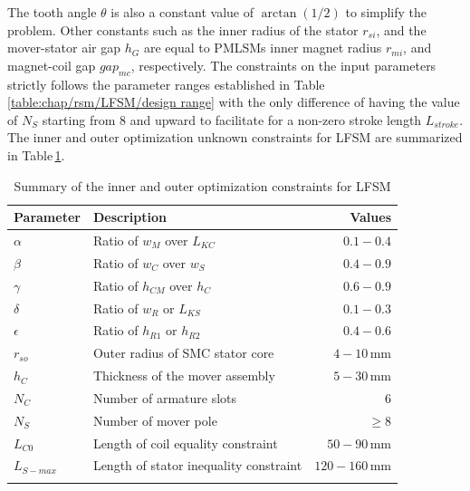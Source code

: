                 
                The tooth angle $\theta$ is also a constant value of $\arctan(1/2)$ to simplify the problem. Other constants such as the inner radius of the stator $r_{si}$, and the mover-stator air gap $h_G$ are equal to \acsp{PMLSM} inner magnet radius $r_{mi}$, and magnet-coil gap $gap_{mc}$, respectively. The constraints on the input parameters strictly follows the parameter ranges established in Table\,\ref{table:chap/rsm/LFSM/design range} with the only difference of having the value of $N_S$ starting from $8$ and upward to facilitate for a non-zero stroke length $L_{stroke}$. The inner and outer optimization unknown constraints for \acs{LFSM} are summarized in Table\,\ref{table:chap/rsm/LFSM/optimization unknown constraints}.
                
                
                \begin{table}[!ht]
                    \renewcommand{\arraystretch}{1.2}
                    \caption{Summary of the inner and outer optimization constraints for \acs{LFSM}}
                    \label{table:chap/rsm/LFSM/optimization unknown constraints}
                    \centering
                    \begin{tabular}{@{}llr@{}}
                    \hline
                    \bfseries Parameter & \bfseries Description & \bfseries Values\\
                    \hline
                        $\alpha$	    & Ratio of $w_M$ over $L_{KC}$              &	$0.1-0.4$\\ 
                        $\beta$	        & Ratio of $w_C$ over $w_S$		            &	$0.4-0.9$\\ 
                        $\gamma$	    & Ratio of $h_{CM}$ over $h_C$			    &	$0.6-0.9$\\ 
                        $\delta$	    & Ratio of $w_R$ or $L_{KS}$		        &	$0.1-0.3$\\ 
                        $\epsilon$	    & Ratio of $h_{R1}$ or $h_{R2}$		        &	$0.4-0.6$\\ 
                        $r_{so}$	    & Outer radius of SMC stator core 			&	$4-10\,\mathrm{mm}$\\ 
                        $h_C$           & Thickness of the mover assembly           &	$5-30\,\mathrm{mm}$\\ 
                    \hline
                        $N_C$	        & Number of armature slots 		            &	$6$\\ 
                        $N_S$	        & Number of mover pole 		                &	$\geq 8$\\ 
                        $L_{C0}$	    & Length of coil equality constraint		&	$50-90\,\mathrm{mm}$\\ 
                        $L_{S-max}$	    & Length of stator inequality constraint	&	$120-160\,\mathrm{mm}$\\
                    \hline  \\
                    \end{tabular}
                \end{table}    
                
